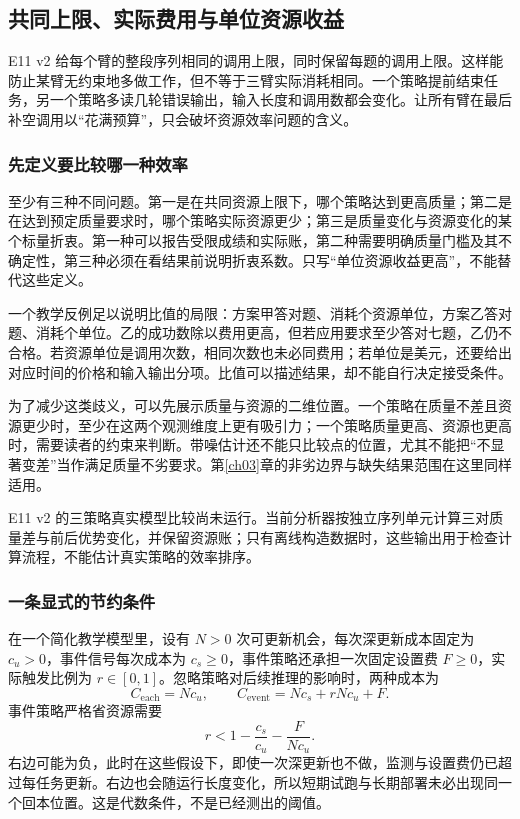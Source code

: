 \subsection{共同上限、实际费用与单位资源收益}
\label{sec:ch13-resource-estimand}

E11 v2 给每个臂的整段序列相同的调用上限，同时保留每题的调用上限。这样能防止某臂无约束地多做工作，但不等于三臂实际消耗相同。一个策略提前结束任务，另一个策略多读几轮错误输出，输入长度和调用数都会变化。让所有臂在最后补空调用以“花满预算”，只会破坏资源效率问题的含义。

\subsubsection{先定义要比较哪一种效率}

至少有三种不同问题。第一是在共同资源上限下，哪个策略达到更高质量；第二是在达到预定质量要求时，哪个策略实际资源更少；第三是质量变化与资源变化的某个标量折衷。第一种可以报告受限成绩和实际账，第二种需要明确质量门槛及其不确定性，第三种必须在看结果前说明折衷系数。只写“单位资源收益更高”，不能替代这些定义。

一个教学反例足以说明比值的局限：方案甲答对题、消耗个资源单位，方案乙答对题、消耗个单位。乙的成功数除以费用更高，但若应用要求至少答对七题，乙仍不合格。若资源单位是调用次数，相同次数也未必同费用；若单位是美元，还要给出对应时间的价格和输入输出分项。比值可以描述结果，却不能自行决定接受条件。

为了减少这类歧义，可以先展示质量与资源的二维位置。一个策略在质量不差且资源更少时，至少在这两个观测维度上更有吸引力；一个策略质量更高、资源也更高时，需要读者的约束来判断。带噪估计还不能只比较点的位置，尤其不能把“不显著变差”当作满足质量不劣要求。第\ref{ch03}章的非劣边界与缺失结果范围在这里同样适用。

E11 v2 的三策略真实模型比较尚未运行。当前分析器按独立序列单元计算三对质量差与前后优势变化，并保留资源账；只有离线构造数据时，这些输出用于检查计算流程，不能估计真实策略的效率排序。

\subsubsection{一条显式的节约条件}

在一个简化教学模型里，设有 $N>0$ 次可更新机会，每次深更新成本固定为 $c_u>0$，事件信号每次成本为 $c_s\ge0$，事件策略还承担一次固定设置费 $F\ge0$，实际触发比例为 $r\in[0,1]$。忽略策略对后续推理的影响时，两种成本为
\[
 C_{\mathrm{each}}=Nc_u,\qquad
 C_{\mathrm{event}}=Nc_s+rNc_u+F.
\]
事件策略严格省资源需要
\[
 r<1-\frac{c_s}{c_u}-\frac{F}{Nc_u}.
\]
右边可能为负，此时在这些假设下，即使一次深更新也不做，监测与设置费仍已超过每任务更新。右边也会随运行长度变化，所以短期试跑与长期部署未必出现同一个回本位置。这是代数条件，不是已经测出的阈值。


